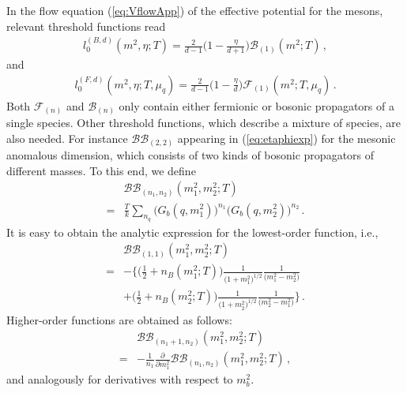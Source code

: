 \documentclass[%
reprint,
superscriptaddress,
showpacs,preprintnumbers,
 amsmath,amssymb,
 aps,
prd,
]{revtex4-1}
\def\eq#1{(\ref{#1})}
\begin{document}
In the flow equation \eq{eq:VflowApp} of the effective potential for
the mesons, relevant threshold functions read
%
\begin{align}
  l_{0}^{(B,d)}(m^2,\eta;T)=\frac{2}{d-1}\Big(1-\frac{\eta}{d
     +1}\Big)\mathcal{B}_{(1)}(m^2;T)\,,\label{eq:l0Bd}
\end{align}
%
and
%
\begin{align}
  l_{0}^{(F,d)}(m^2,\eta;T,\mu_q)
  =\frac{2}{d-1}\Big(1-\frac{\eta}{d}
  \Big)\mathcal{F}_{(1)}(m^2;T,\mu_q)\,.\label{eq:l0Fd}
\end{align}
%
Both $\mathcal{F}_{(n)}$ and $\mathcal{B}_{(n)}$ only contain either
fermionic or bosonic propagators of a single species. Other threshold
functions, which describe a mixture of species, are also needed.  For
instance $\mathcal{BB}_{(2,2)}$ appearing in \eq{eq:etaphiexp} for the
mesonic anomalous dimension, which consists of two kinds of bosonic
propagators of different masses. To this end, we define
%
\begin{align}
  &\mathcal{BB}_{(n_1,n_2)}(m_1^2,m_2^2;T)\nonumber\\[1ex]
  =&\frac{T}{k}\sum_{n_q}\Big(G_{b}(q,m_1^2)\Big)^{n_1}
     \Big(G_{b}(q,m_2^2)\Big)^{n_2}\,.
\end{align}
%
It is easy to obtain the analytic expression for the lowest-order
function, i.e.,
%
\begin{align} 
  &\mathcal{BB}_{(1,1)}(m_1^2,m_2^2;T)\nonumber\\[1ex]
  =&-\bigg\{\Big(\frac{1}{2}+n_{B}(m_1^2;T)\Big)\frac{1}{
     \big(1+m_1^2\big)^{1/2}}\frac{1}{\big(m_1^2-m_2^2
     \big)}\nonumber \\[1ex]
  &+\Big(\frac{1}{2}+n_{B}(m_2^2;T)\Big)\frac{1}{
    \big(1+m_2^2\big)^{1/2}}\frac{1}{\big(m_2^2-m_1^2
    \big)}\bigg\}\,.
\end{align}
%
Higher-order functions are obtained as follows:
%
\begin{align}
  &\mathcal{BB}_{(n_1+1,n_2)}(m_1^2,m_2^2;T)\nonumber\\[1ex]
  =&-\frac{1}{n_1}\frac{\partial}{\partial m_1^2}
     \mathcal{BB}_{(n_1,n_2)}(m_1^2,m_2^2;T)\,,
\end{align}
%
and analogously for derivatives with respect to $m_{b}^{2}$.
\end{document}
